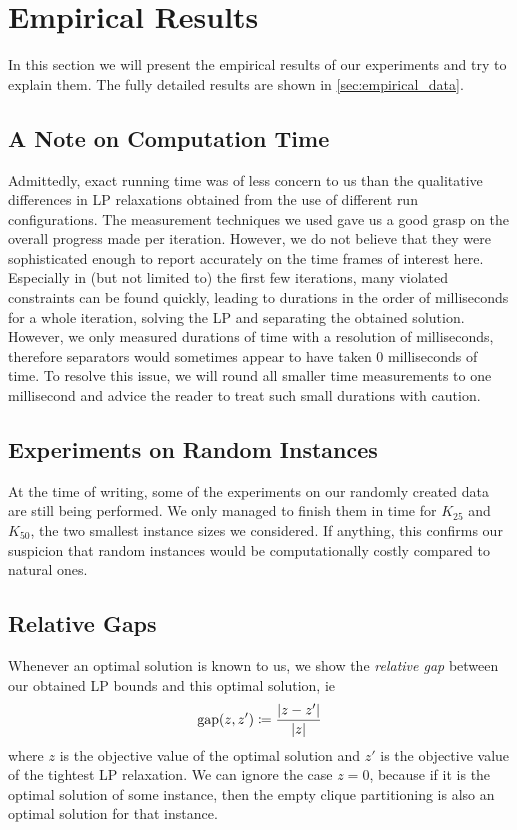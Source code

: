\section{Empirical Results}\label{sec:empirical_results}
In this section we will present the empirical results of our experiments and try to explain them.
The fully detailed results are shown in \cref{sec:empirical_data}.

\subsection{A Note on Computation Time}\label{subsec:note_computation_time}
Admittedly, exact running time was of less concern to us than the qualitative differences in LP relaxations obtained from the use of different run configurations.
The measurement techniques we used gave us a good grasp on the overall progress made per iteration.
However, we do not believe that they were sophisticated enough to report accurately on the time frames of interest here.
Especially in (but not limited to) the first few iterations, many violated constraints can be found quickly,
leading to durations in the order of milliseconds for a whole iteration, \ie solving the LP and separating the obtained solution.
However, we only measured durations of time with a resolution of milliseconds, therefore separators would sometimes appear to have taken 0 milliseconds of time.
To resolve this issue, we will round all smaller time measurements to one millisecond and advice the reader to treat such small durations with caution.

\subsection{Experiments on Random Instances}\label{subsec:random_experiments}
At the time of writing, some of the experiments on our randomly created data are still being performed.
We only managed to finish them in time for $K_{25}$ and $K_{50}$, the two smallest instance sizes we considered.
If anything, this confirms our suspicion that random instances would be computationally costly compared to natural ones.

\subsection{Relative Gaps}\label{subsec:gaps}
Whenever an optimal solution is known to us, we show the \textit{relative gap} between our obtained LP bounds and this optimal solution, ie
\[
	\operatorname{\text{gap}}(z, z') \coloneqq \frac{\lvert z - z' \rvert}{\lvert z \rvert}
\]
where $z$ is the objective value of the optimal solution and $z'$ is the objective value of the tightest LP relaxation.
We can ignore the case $z = 0$, because if it is the optimal solution of some instance, then the empty clique partitioning is also an optimal solution for that instance.


